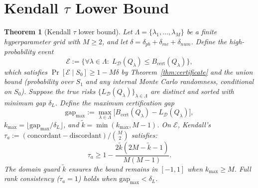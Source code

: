 \documentclass[11pt,a4paper]{article}
\newtheorem{theorem}{Theorem}
\newcommand{\cD}{\mathcal{D}}
\newcommand{\gapmax}{\mathrm{gap}_{\max}}
\begin{document}
\section{Kendall $\tau$ Lower Bound}

\begin{theorem}[Kendall $\tau$ lower bound]
\label{thm:kendall}
Let $\Lambda = \{\lambda_1, \dots, \lambda_M\}$ be a finite hyperparameter grid with $M \ge 2$, and let $\delta = \delta_{pb} + \delta_{mc} + \delta_{num}$. Define the high-probability event
\[
\mathcal{E} := \bigl\{\forall \lambda \in \Lambda:\; L_\cD(Q_\lambda) \le B_{\mathrm{cert}}(Q_\lambda)\bigr\},
\]
which satisfies $\Pr[\mathcal{E} \mid S_0] \ge 1 - M\delta$ by Theorem~\ref{thm:certificate} and the union bound (probability over $S_1$ and any internal Monte Carlo randomness, conditional on $S_0$). Suppose the true risks $\{L_\cD(Q_\lambda)\}_{\lambda \in \Lambda}$ are distinct and sorted with minimum gap $\delta_L$. Define the maximum certification gap
\[
\gapmax := \max_{\lambda \in \Lambda}\bigl[B_{\mathrm{cert}}(Q_\lambda) - L_\cD(Q_\lambda)\bigr],
\]
$k_{\max} = \lfloor \gapmax / \delta_L \rfloor$, and $\tilde{k} = \min(k_{\max}, M-1)$. On $\mathcal{E}$, Kendall's $\tau_a := (\text{concordant} - \text{discordant})/\binom{M}{2}$ satisfies:
\[
\tau_a \ge 1 - \frac{2\tilde{k}(2M - \tilde{k} - 1)}{M(M-1)}.
\]
The domain guard $\tilde{k}$ ensures the bound remains in $[-1, 1]$ when $k_{\max} \ge M$. Full rank consistency ($\tau_a = 1$) holds when $\gapmax < \delta_L$.
\end{theorem}
\end{document}
